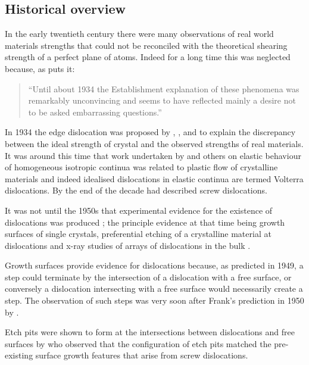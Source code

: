 \FloatBarrier

\subsection{Historical overview}
In the early twentieth century there were many observations of real world materials strengths that could not be reconciled with the theoretical shearing strength of a perfect plane of atoms. Indeed for a long time this was neglected because, as \citet{gordon1991} puts it:
\begin{quote}
``Until about 1934 the Establishment explanation of these phenomena was remarkably unconvincing and seems to have reflected mainly a desire not to be asked embarrassing questions.''
\end{quote}

In 1934 the edge dislocation was proposed by \citet{orowan1934i,orowan1934ii,orowan1934iii}, \citet{Taylor1934}, and \citet{polanyi1934} to explain the discrepancy between the ideal strength of crystal and the observed strengths of real materials. It was around this time that work undertaken by \citet{Volterra1907} and others %
on elastic behaviour of homogeneous isotropic continua was related to plastic flow of crystalline materials and indeed idealised dislocations in elastic continua are termed Volterra dislocations. By the end of the decade \citet{burgers1939} had described screw dislocations.

It was not until the 1950s that experimental evidence for the existence of dislocations was produced ; the principle evidence at that time being growth surfaces of single crystals, preferential etching of a crystalline material at dislocations and x-ray studies of arrays of dislocations in the bulk \cite{Forty1954}. 

Growth surfaces provide evidence for dislocations because, as \citet{Frank1949} predicted in 1949, a step could terminate by the intersection of a dislocation with a free surface, or conversely a dislocation intersecting with a free surface would necessarily create a step. The observation of such steps was very soon after Frank's prediction in 1950 by \citet{Griffin1950}.

Etch pits were shown to form at the intersections between dislocations and free surfaces by \citet{Horn1952} who observed that the configuration of etch pits matched the pre-existing surface growth features that arise from screw dislocations.

